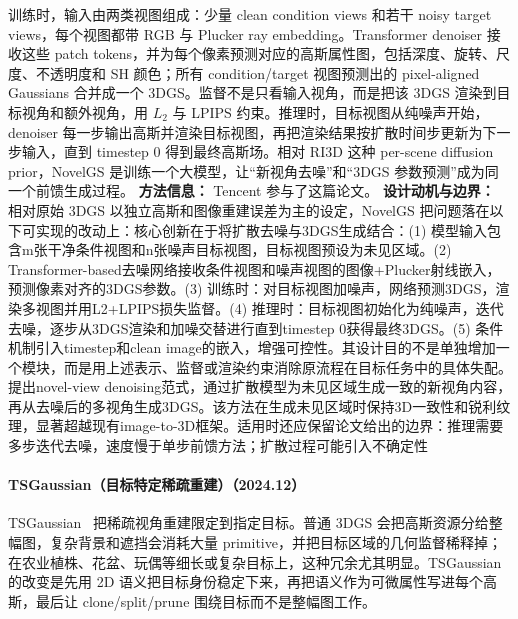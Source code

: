 训练时，输入由两类视图组成：少量 clean condition views 和若干 noisy target views，每个视图都带 RGB 与 Plucker ray embedding。Transformer denoiser 接收这些 patch tokens，并为每个像素预测对应的高斯属性图，包括深度、旋转、尺度、不透明度和 SH 颜色；所有 condition/target 视图预测出的 pixel-aligned Gaussians 合并成一个 3DGS。监督不是只看输入视角，而是把该 3DGS 渲染到目标视角和额外视角，用 $L_2$ 与 LPIPS 约束。推理时，目标视图从纯噪声开始，denoiser 每一步输出高斯并渲染目标视图，再把渲染结果按扩散时间步更新为下一步输入，直到 timestep 0 得到最终高斯场。相对 RI3D 这种 per-scene diffusion prior，NovelGS 是训练一个大模型，让“新视角去噪”和“3DGS 参数预测”成为同一个前馈生成过程。
\textbf{方法信息：} Tencent 参与了这篇论文。
\textbf{设计动机与边界：} 相对原始 3DGS 以独立高斯和图像重建误差为主的设定，NovelGS 把问题落在以下可实现的改动上：核心创新在于将扩散去噪与3DGS生成结合：(1) 模型输入包含m张干净条件视图和n张噪声目标视图，目标视图预设为未见区域。(2) Transformer-based去噪网络接收条件视图和噪声视图的图像+Plucker射线嵌入，预测像素对齐的3DGS参数。(3) 训练时：对目标视图加噪声，网络预测3DGS，渲染多视图并用L2+LPIPS损失监督。(4) 推理时：目标视图初始化为纯噪声，迭代去噪，逐步从3DGS渲染和加噪交替进行直到timestep 0获得最终3DGS。(5) 条件机制引入timestep和clean image的嵌入，增强可控性。其设计目的不是单独增加一个模块，而是用上述表示、监督或渲染约束消除原流程在目标任务中的具体失配。提出novel-view denoising范式，通过扩散模型为未见区域生成一致的新视角内容，再从去噪后的多视角生成3DGS。该方法在生成未见区域时保持3D一致性和锐利纹理，显著超越现有image-to-3D框架。适用时还应保留论文给出的边界：推理需要多步迭代去噪，速度慢于单步前馈方法；扩散过程可能引入不确定性
\paragraph{TSGaussian（目标特定稀疏重建）（2024.12）}
TSGaussian~\cite{2412_10051} 把稀疏视角重建限定到指定目标。普通 3DGS 会把高斯资源分给整幅图，复杂背景和遮挡会消耗大量 primitive，并把目标区域的几何监督稀释掉；在农业植株、花盆、玩偶等细长或复杂目标上，这种冗余尤其明显。TSGaussian 的改变是先用 2D 语义把目标身份稳定下来，再把语义作为可微属性写进每个高斯，最后让 clone/split/prune 围绕目标而不是整幅图工作。

